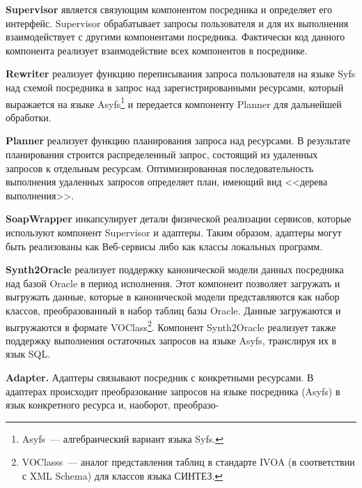 \begin{multicols}{2}



\noindent
\textbf{Supervisor} является связующим компонентом посредника и определяет его
интерфейс. Supervisor обрабатывает запросы пользователя и для их выполнения
взаимодействует с другими компонентами посредника. Фактически код данного
компонента реализует взаимодействие всех компонентов в посреднике.

\bigskip

\noindent
\textbf{Rewriter} реализует функцию переписывания запроса пользователя на языке
Syfs над схемой посредника в запрос над зарегистрированными ресурсами, который
выражается на языке Asyfs\footnote{Asyfs~--- алгебраический вариант языка Syfs.} и
передается компоненту Planner для дальнейшей обработки.

\bigskip

\noindent
\textbf{Planner} реализует функцию планирования запроса над ресурсами. В
результате планирования строится распределенный запрос, состоящий из удаленных
запросов к отдельным ресурсам. Оптимизированная последовательность выполнения
удаленных запросов определяет план, имеющий вид <<дерева выполнения>>.

\bigskip

\noindent
\textbf{SoapWrapper} инкапсулирует детали физической реализации сервисов,
которые используют компонент Supervisor и адаптеры. Таким образом, адаптеры могут
быть реализованы как Веб-сервисы либо как классы локальных программ.

\medskip

\noindent
\textbf{Synth2Oracle} реализует поддержку канонической модели данных
посредника над базой Oracle в период исполнения. Этот компонент позволяет загружать и
выгружать данные, которые в канонической модели представляются как набор классов,
преобразованный в набор таблиц базы Oracle. Данные загружаются и выгружаются в
формате VOClass\footnote{VOClasss~--- аналог представления таблиц в стандарте IVOA (в
соответствии с XML Schema) для классов языка СИНТЕЗ.}. Компонент Synth2Oracle
реализует также поддержку выполнения остаточных запросов на языке Asyfs, транслируя
их в язык SQL.

\medskip

\noindent
\textbf{Adapter.} Адаптеры связывают посредник с конкретными ресурсами. В
адаптерах происходит преобразование запросов на языке посредника (Asyfs) в язык
конкретного ресурса и, наоборот, преобразо-\linebreak
\vspace*{-12pt}
\pagebreak


\end{multicols}
